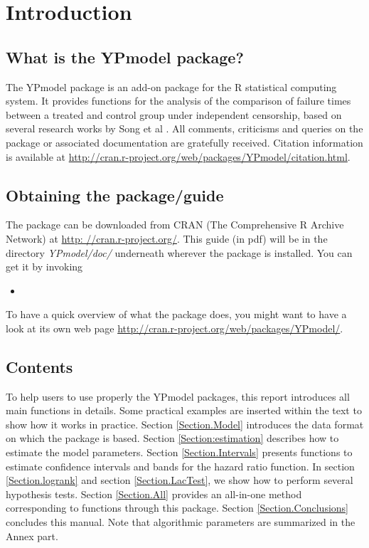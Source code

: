 \documentclass[12pt]{article}
\newcommand{\insertcode}[2]{\begin{itemize}\item[]\end{itemize}} %
\begin{document}
\section{Introduction}

\subsection{What is the YPmodel package?}
The YPmodel package is an add-on package for the R \cite{team2008r} statistical computing system. It provides functions for the analysis of the comparison of failure times between a treated and control group under independent censorship, based on several research works by Song et al \cite{yang2005semiparametric,yang2009improved,yang2011estimation,yang2012checking}.
All comments, criticisms and queries on the package or associated documentation are gratefully
received. Citation information is available at \href{http://cran.r-project.org/web/packages/YPmodel/citation.html}{http://cran.r-project.org/web/packages/YPmodel/citation.html}.

\subsection{Obtaining the package/guide}
The package can be downloaded from CRAN (The Comprehensive R Archive Network) at \href{http:
//cran.r-project.org/}{http:
//cran.r-project.org/}. This guide (in pdf) will be in the directory \textit{YPmodel/doc/}
underneath wherever the package is installed. You can get it by invoking
\insertcode{"Scripts/code0.pl"}{YPmodel help documentation.}
To have a quick overview of what the package does, you might want to have a look at its
own web page \href{http://cran.r-project.org/web/packages/YPmodel/}{http://cran.r-project.org/web/packages/YPmodel/}.

\subsection{Contents}
To help users to use properly the YPmodel packages, this report introduces all main functions in details. Some practical examples are inserted within the text to show how it works in practice. Section \ref{Section.Model} introduces the data format on which the package is based.
Section \ref{Section:estimation} describes how to estimate the model parameters. Section \ref{Section.Intervals} presents functions to estimate confidence intervals and bands for the hazard ratio function. In section  \ref{Section.logrank} and section \ref{Section.LacTest}, we show how to perform several hypothesis tests. Section \ref{Section.All} provides an all-in-one method corresponding to functions through this package. Section \ref{Section.Conclusions} concludes this manual. Note that algorithmic parameters are summarized in the Annex part.
\end{document}
